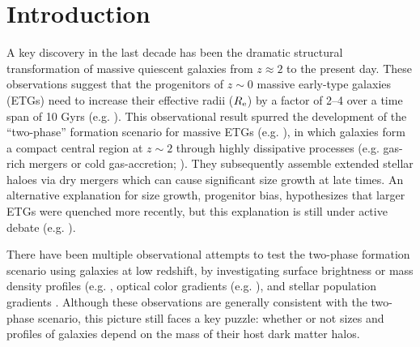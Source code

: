 \documentclass[a4paper,fleqn,usenatbib]{mnras}
\begin{document}



\section{Introduction}
    \label{sec:intro}
    
    A key discovery in the last 
    decade has been the dramatic structural transformation of massive quiescent 
    galaxies \citep[e.g.][]{Trujillo2006, vanDokkum2008, Cimatti2008, Damjanov2009, 
    vanderWel2011, Szomoru2012, Patel2013} from $z \approx 2$ to the present day. 
    These observations suggest that the progenitors of $z{\sim} 0$ massive early-type 
    galaxies (ETGs) need to increase their effective radii ($R_{\rm e}$) by a factor 
    of 2--4 over a time span of 10 Gyrs (e.g. \citealt{Newman2012, vdWel2014}). 
    This observational result spurred the development of the ``two-phase'' formation
    scenario for massive ETGs (e.g. \citealt{Oser2010, Oser2012}),
    in which galaxies form a compact central region at $z\sim 2$ through highly 
    dissipative processes (e.g. gas-rich mergers or cold gas-accretion;
    \citealt{Hopkins2008, Dekel2009}). 
    They subsequently assemble extended stellar haloes via dry mergers 
    \citep[e.g,][]{Naab2006, Khochfar2006, Oser2010, Oser2012} which can cause 
    significant size growth at late times. 
    An alternative explanation for size growth, progenitor bias, hypothesizes that 
    larger ETGs were quenched more recently, but this explanation is still under 
    active debate (e.g. \citealt{Newman2012, Carollo2013, Poggianti2013, Belli2015,
    Keating2015, Fagioli2016}). 
    
    There have been multiple observational attempts to test the two-phase 
    formation scenario using galaxies at low redshift, by investigating surface 
    brightness or mass density profiles (e.g. \citealt{Huang2013a, Huang2013b, 
    Oh2017}, optical color gradients (e.g. \citealt{LaBarbera2010, LaBarbera2012}), 
    and stellar population gradients \citep[e.g.,][]{Coccato2010, Coccato2011, 
    Greene2015, Barbosa2016}. 
    Although these observations are generally consistent with the two-phase scenario, 
    this picture still faces a key puzzle: whether or not sizes and profiles of galaxies 
    depend on the mass of their host dark matter halos.
 
\end{document}
